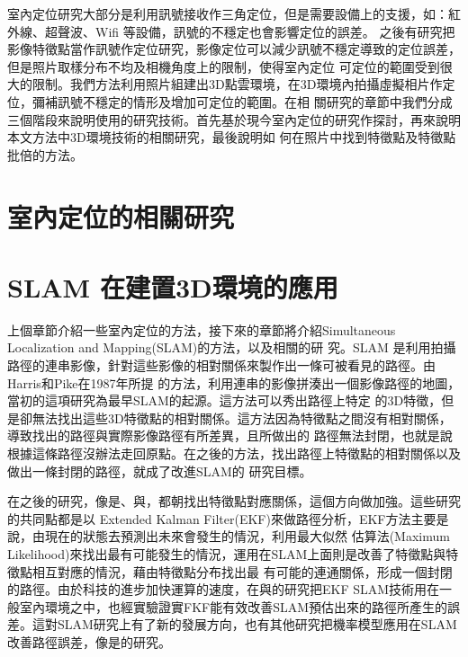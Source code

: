 
	室內定位研究大部分是利用訊號接收作三角定位，但是需要設備上的支援，如：紅外線、超聲波、Wifi 等設備，訊號的不穩定也會影響定位的誤差。
之後有研究把影像特徵點當作訊號作定位研究，影像定位可以減少訊號不穩定導致的定位誤差，但是照片取樣分布不均及相機角度上的限制，使得室內定位
可定位的範圍受到很大的限制。我們方法利用照片組建出3D點雲環境，在3D環境內拍攝虛擬相片作定位，彌補訊號不穩定的情形及增加可定位的範圍。在相
關研究的章節中我們分成三個階段來說明使用的研究技術。首先基於現今室內定位的研究作探討，再來說明本文方法中3D環境技術的相關研究，最後說明如
何在照片中找到特徵點及特徵點批倍的方法。

\section{室內定位的相關研究}

\section{SLAM 在建置3D環境的應用}

	上個章節介紹一些室內定位的方法，接下來的章節將介紹Simultaneous Localization and Mapping(SLAM)的方法，以及相關的研
究。SLAM 是利用拍攝路徑的連串影像，針對這些影像的相對關係來製作出一條可被看見的路徑。由Harris和Pike在1987年所提
\cite{Harris198887}的方法，利用連串的影像拼湊出一個影像路徑的地圖，當初的這項研究為最早SLAM的起源。這方法可以秀出路徑上特定
的3D特徵，但是卻無法找出這些3D特徵點的相對關係。這方法因為特徵點之間沒有相對關係，導致找出的路徑與實際影像路徑有所差異，且所做出的
路徑無法封閉，也就是說根據這條路徑沒辦法走回原點。在之後的方法，找出路徑上特徵點的相對關係以及做出一條封閉的路徑，就成了改進SLAM的
研究目標。

	在之後的研究，像是\cite{174711}、\cite{1087373}與\cite{Smith1988}，都朝找出特徵點對應關係，這個方向做加強。這些研究的共同點都是以 Extended Kalman Filter(EKF)來做路徑分析，EKF方法主要是說，由現在的狀態去預測出未來會發生的情況，利用最大似然
估算法(Maximum Likelihood)來找出最有可能發生的情況，運用在SLAM上面則是改善了特徵點與特徵點相互對應的情況，藉由特徵點分布找出最
有可能的連通關係，形成一個封閉的路徑。由於科技的進步加快運算的速度，在\cite{Betge1996}與\cite{Davison2001}的研究把EKF 
SLAM技術用在一般室內環境之中，也經實驗證實FKF能有效改善SLAM預估出來的路徑所產生的誤差。這對SLAM研究上有了新的發展方向，也有其他研究把機率模型應用在SLAM改善路徑誤差，像是\cite{Durrant2003}的研究。

